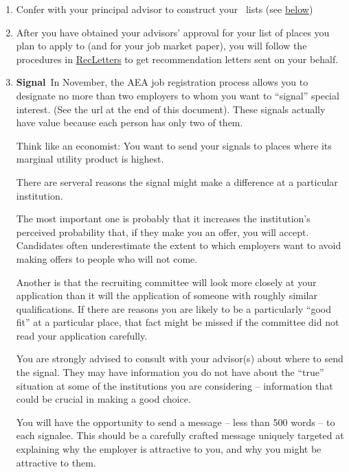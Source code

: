 \documentclass{\classes/econtex}
\begin{document}
\begin{enumerate}
  \hypertarget{\EM}{}
\item Confer with your principal advisor to construct your~{\EMtt} lists (see \hyperlink{below}{below})
  
  \hypertarget{Rec-Letters}{}
\item After you have obtained your advisors' approval for your list of
  places you plan to apply to (and for your job market paper), you
  will follow the procedures in \href{\pageurl/RecLetters}{RecLetters} 
  to get recommendation letters sent on your behalf.

\item \ifdvi\hypertarget{Signal}{\textbf{Signal}~}\fi In November, the AEA job registration process 
  allows you to designate no more than two employers to whom you want
  to ``signal'' special interest.  (See the url at the end of this
  document).  These signals actually have value because 
  each person has only two of them.

  Think like an economist: You want to send your signals to places where its 
  marginal utility product is highest.

  There are serveral reasons the signal might make a difference at a particular institution.

  The most important one is probably that it increases the institution's perceived probability that, if they make you an offer, you will accept.  Candidates often underestimate the extent to which employers want to avoid making offers to people who will not come.  
  
  Another is that the recruiting committee will look more closely at your application than it will the application of someone with roughly similar qualifications. If there are reasons you are likely to be a particularly ``good fit'' at a particular place, that fact might be missed if the committee did not read your application carefully.

  You are strongly advised to consult with your advisor(s) about where to send the signal. They may have information you do not have about the ``true'' situation at some of the institutions you are considering -- information that could be crucial in making a good choice.


  \hypertarget{Mock-Interviews}{}
  You will have the opportunity to send a message -- less than 500 words -- to each signalee.  This should be a carefully crafted message uniquely targeted at explaining why the employer is attractive to you, and why you might be attractive to them.


\end{enumerate}
\end{document}
